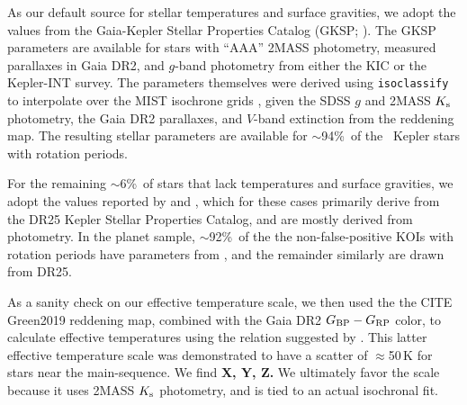 \documentclass[11pt,twocolumn,tighten]{aastex63}
\newcommand{\fracstarswithprotwithbtwenty}{{$\sim$94\%}}
\newcommand{\fracstarswithprotwithoutbtwenty}{{$\sim$6\%}}
\newcommand{\frackoisnofpwithprotwithbtwenty}{{$\sim$92\%}}
\begin{document}
As our default source for stellar temperatures and surface gravities,
we adopt the values from the Gaia-Kepler Stellar Properties Catalog
(GKSP; \citealt{Berger_2020a_catalog}).  The GKSP parameters are
available for stars with ``AAA'' 2MASS photometry, measured parallaxes
in Gaia DR2,  and $g$-band photometry from either the KIC or the
Kepler-INT survey.  The parameters themselves were derived using
\texttt{isoclassify} \citep{2017ApJ...844..102H} to interpolate over
the MIST isochrone grids
\citep{2016ApJ...823..102C,2016ApJS..222....8D}, given the SDSS $g$
and 2MASS $K_{\rm s}$ photometry, the Gaia DR2 parallaxes, and
$V$-band extinction from the \citet{2018MNRAS.478..651G} reddening
map.  The resulting stellar parameters are available for
\fracstarswithprotwithbtwenty\ of the \nuniqstarsantosrot\ Kepler
stars with rotation periods.


For the remaining \fracstarswithprotwithoutbtwenty\ of stars that lack
temperatures and surface gravities, we adopt the values reported by
\citet{Santos_2019} and \citet{Santos_2021}, which for these cases
primarily derive from the \citet{Mathur_2017} DR25 Kepler Stellar
Properties Catalog, and are mostly derived from photometry.  In the
planet sample, \frackoisnofpwithprotwithbtwenty\ of the the
non-false-positive KOIs with rotation periods have parameters from
\citet{Berger_2020a_catalog}, and the remainder similarly are drawn
from DR25. 

As a sanity check on our effective temperature scale, we then used the 
the CITE Green2019 reddening map, combined with the Gaia DR2 $G_{\rm
BP}-G_{\rm RP}$ color, to calculate effective temperatures using the
relation suggested by \citet{Curtis_2020}.
This latter effective temperature scale was demonstrated to have a 
scatter of $\approx$50\,K for stars near the main-sequence.
We find {\bf X, Y, Z.}
We ultimately favor the \citet{Berger_2020a_catalog} scale
because it uses 2MASS $K_{\rm s}$ photometry, and is tied to an actual
isochronal fit.
\end{document}
